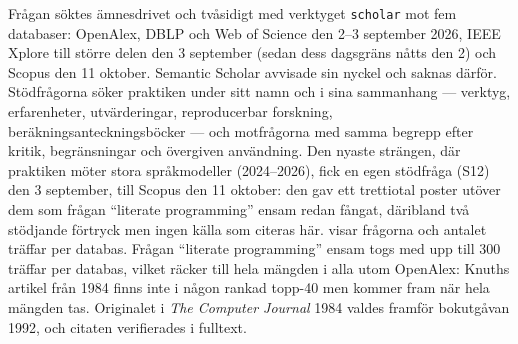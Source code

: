 Frågan söktes ämnesdrivet och tvåsidigt med verktyget \texttt{scholar}
mot fem databaser: OpenAlex, DBLP och Web of Science den 2--3 september
2026, IEEE Xplore till större delen den 3 september (sedan dess dagsgräns
nåtts den 2) och Scopus den 11 oktober.  Semantic Scholar avvisade sin
nyckel och saknas därför.  Stödfrågorna söker praktiken under sitt namn och i sina
sammanhang --- verktyg, erfarenheter, utvärderingar, reproducerbar
forskning, beräkningsanteckningsböcker --- och motfrågorna med samma
begrepp efter kritik, begränsningar och övergiven användning.  Den
nyaste strängen, där praktiken möter stora språkmodeller (2024--2026),
fick en egen stödfråga (S12) den 3 september, till Scopus den 11
oktober: den gav ett trettiotal
poster utöver dem som frågan \enquote{literate programming} ensam redan
fångat, däribland två stödjande förtryck men ingen källa som citeras
här.
 visar frågorna och antalet
träffar per databas.  Frågan \enquote{literate programming} ensam togs
med upp till 300 träffar per databas, vilket räcker till hela mängden i
alla utom OpenAlex: Knuths artikel från 1984 finns inte i någon rankad
topp-40 men kommer fram när hela mängden tas.  Originalet i \emph{The Computer
Journal} 1984 valdes framför bokutgåvan 1992, och citaten verifierades i
fulltext.

